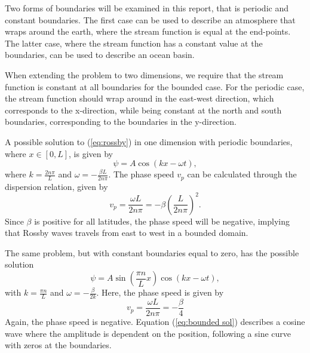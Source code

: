 Two forms of boundaries will be examined in this report, that is periodic and constant boundaries. The first case can be used to describe an atmosphere that wraps around the earth, where the stream function is equal at the end-points. The latter case, where the stream function has a constant value at the boundaries, can be used to describe an ocean basin.

When extending the problem to two dimensions, we require that the stream function is constant at all boundaries for the bounded case. For the periodic case, the stream function should wrap around in the east-west direction, which corresponds to the x-direction, while being constant at the north and south boundaries, corresponding to the boundaries in the y-direction.

A possible solution to (\ref{eq:rossby}) in one dimension with periodic boundaries, where $x \in \left[0,L \right] $, is given by
\begin{equation}\label{eq:periodic sol}
	\psi = A\cos{\left(kx-\omega t\right)},
\end{equation}
where $k=\frac{2n\pi}{L}$ and $\omega = - \frac{\beta L}{2n\pi}$. The phase speed $v_p$ can be calculated through the dispersion relation, given by
\begin{equation}
	v_p = \frac{\omega L}{2n\pi}=-\beta \left(\frac{L}{2n\pi}\right)^2.
\end{equation}
Since $\beta$ is positive for all latitudes, the phase speed will be negative, implying that Rossby waves travels from east to west in a bounded domain.

The same problem, but with constant boundaries equal to zero, has the possible solution
\begin{equation}\label{eq:bounded sol}
	\psi = A\sin\left(\frac{\pi n}{L}x\right)\cos\left(kx-\omega t\right),
\end{equation}
with $k = \frac{\pi n}{L}$ and $\omega = - \frac{\beta}{2k}$. Here, the phase speed is given by
\begin{equation}
	\label{eq:phasespeed}
	v_p = \frac{\omega L}{2n\pi} = - \frac{\beta}{4}
\end{equation}
Again, the phase speed is negative. Equation (\ref{eq:bounded sol}) describes a cosine wave where the amplitude is dependent on the position, following a sine curve with zeros at the boundaries.


